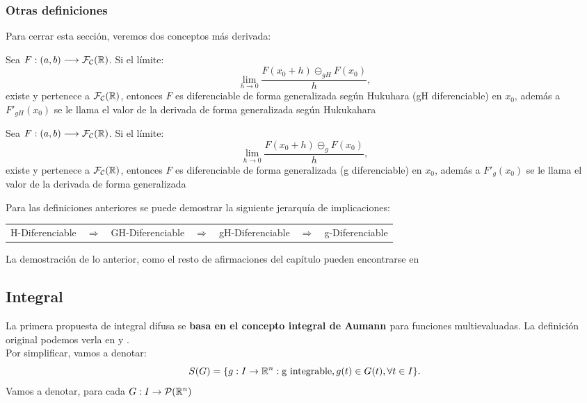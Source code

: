 \subsubsection{Otras definiciones}

Para cerrar esta sección, veremos dos conceptos más derivada:

\begin{definicion}
  Sea $F: (a, b) \longrightarrow \mathcal{F}_\mathcal{C}(\mathbb R)$. Si el límite:
  \[
  	\lim\limits_{h \rightarrow 0} \frac{F(x_0 + h) \circleddash_{gH} F(x_0)}{h},
  \]
  existe y pertenece a $\mathcal{F}_\mathcal{C} (\mathbb R)$, entonces $F$ es diferenciable de forma generalizada según Hukuhara (gH diferenciable) en $x_0$, además a $F'_{gH}(x_0)$ se le llama el valor de la derivada de forma generalizada según Hukukahara
\end{definicion}

\begin{definicion}
  \label{def:diferencial_generalizada}
  Sea $F: (a, b) \longrightarrow \mathcal{F}_\mathcal{C}(\mathbb R)$. Si el límite:
\[
\lim\limits_{h \rightarrow 0} \frac{F(x_0 + h) \circleddash_{g} F(x_0)}{h},
\]
existe y pertenece a $\mathcal{F}_\mathcal{C} (\mathbb R)$, entonces $F$ es diferenciable de forma generalizada (g diferenciable) en $x_0$, además a $F'_{g}(x_0)$ se le llama el valor de la derivada de forma generalizada
\end{definicion}

Para las definiciones anteriores se puede demostrar la siguiente jerarquía de implicaciones:
\begin{table}[h]
  \centering
  \begin{tabular}{lllllll}
    H-Diferenciable & $\Rightarrow$ & GH-Diferenciable & $\Rightarrow$ & gH-Diferenciable & $\Rightarrow$ & g-Diferenciable
  \end{tabular}
\end{table}

La demostración de lo anterior, como el resto de afirmaciones del capítulo pueden encontrarse en \cite{fuzzyintro}

\subsection{Integral}
La primera propuesta de integral difusa se \textbf{basa en el concepto integral de Aumann \cite{aumannintegral}} para funciones multievaluadas. La definición original podemos verla en \cite{integral1} y \cite{integral2}. \\
Por simplificar, vamos a denotar:
\[
S(G) = \{g : I \rightarrow \mathbb R^n : \text{g integrable}, g(t) \in G(t), \forall t \in I \}.
\]
Vamos a denotar, para cada $G : I \rightarrow \mathcal{P}(\mathbb R^n)$

